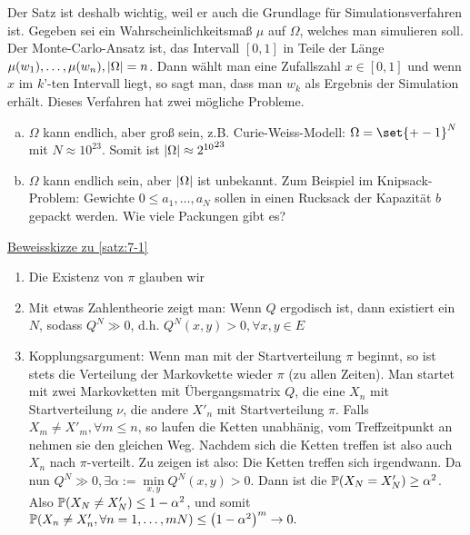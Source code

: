 \begin{bemerkung}
	Der Satz ist deshalb wichtig, weil er auch die Grundlage für Simulationsverfahren ist. Gegeben sei ein Wahrscheinlichkeitsmaß $\mu$ auf $\Omega$, welches man simulieren soll. Der Monte-Carlo-Ansatz ist, das Intervall $[0,1]$ in Teile der Länge $\mu(w_1), \dots, \mu(w_n), \lvert\Omega\rvert = n$. Dann wählt man eine Zufallszahl $x \in [0,1]$ und wenn $x$ im $k$'-ten Intervall liegt, so sagt man, dass man $w_k$ als Ergebnis der Simulation erhält. Dieses Verfahren hat zwei mögliche Probleme. 
	\begin{enumerate}[a)]
		\item $\Omega$ kann endlich, aber groß sein, z.B. Curie-Weiss-Modell: $\Omega = \set{+- 1}^N$ mit $N \approx 10^{23}$. Somit ist $\lvert\Omega\rvert \approx {2^{10}}^{23}$
		\item $\Omega$ kann endlich sein, aber $\lvert\Omega\rvert$ ist unbekannt. Zum Beispiel im Knipsack-Problem: Gewichte $0 \leq a_1, \dots, a_N$ sollen in einen Rucksack der Kapazität $b$ gepackt werden. Wie viele Packungen gibt es?
	\end{enumerate}
\end{bemerkung}

	\underline{Beweisskizze zu \autoref{satz:7-1}} 
	\begin{enumerate}
		\item Die Existenz von $\pi$ glauben wir
		\item Mit etwas Zahlentheorie zeigt man: Wenn $Q$ ergodisch ist, dann existiert ein $N$, sodass $Q^N \gg 0$, d.h. $Q^N(x,y) > 0, \forall x,y \in E$
		\item Kopplungsargument: Wenn man mit der Startverteilung $\pi$ beginnt, so ist stets die Verteilung der Markovkette wieder $\pi$ (zu allen Zeiten). Man startet mit zwei Markovketten mit Übergangsmatrix $Q$, die eine $X_n$ mit Startverteilung $\nu$, die andere $X'_n$ mit Startverteilung $\pi$. Falls $X_m \neq X'_m, \forall m \leq n$, so laufen die Ketten unabhänig, vom Treffzeitpunkt an nehmen sie den gleichen Weg. Nachdem sich die Ketten treffen ist also auch $X_n$ nach $\pi$-verteilt. Zu zeigen ist also: Die Ketten treffen sich irgendwann. Da nun $Q^N \gg 0, \exists \alpha := \min\limits_{x,y} Q^N(x,y) > 0$. Dann ist die $\propE{X_N = X'_N} \geq \alpha^2$. Also $\propE{X_N \neq X'_N} \leq 1- \alpha^2$, und somit $\propE{X_n \neq X'_n, \forall n = 1, \dots, mN} \leq \enb{1- \alpha^2}^m \to 0.$
	\end{enumerate}

